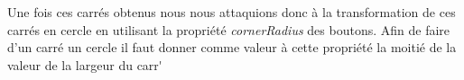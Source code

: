 \documentclass{article}
\begin{document}
\indent Une fois ces carr\'{e}s obtenus nous nous attaquions donc \`{a} la transformation de ces carr\'{e}s en cercle en utilisant la propri\'{e}t\'{e} \textit{cornerRadius} des boutons. Afin de faire d'un carr\'{e} un cercle il faut donner comme valeur \`{a} cette propri\'{e}t\'{e} la moiti\'{e} de la valeur de la largeur du carr\'
\end{document}
